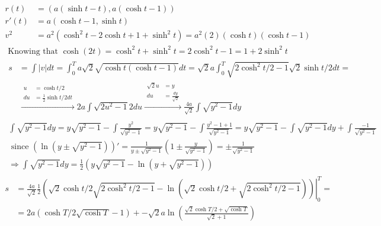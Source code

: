 \documentclass[twoside]{amsart}
\theoremstyle{plain}
\theoremstyle{definition}
\newcommand{\exercisehead}[1]
  {\smallskip
   \noindent{\small\bf Exercise #1.}}
\begin{document}
\exercisehead{5} 
\[
\begin{aligned}
  r(t) & = (a(\sinh{t}-t), a(\cosh{t} -1) ) \\
  r'(t) & = a(\cosh{t} - 1,\sinh{t}) \\
  v^2 & = a^2 (\cosh^2{t} - 2\cosh{t} + 1 + \sinh^2{t} ) = a^2 (2) (\cosh{t})(\cosh{t}-1)
\end{aligned}
\]
\[
\begin{gathered}
\text{ Knowing that } \cosh{(2t)} = \cosh^2{t} + \sinh^2{t} = 2 \cosh^2{t} - 1 = 1 +2 \sinh^2{t} \\
  \begin{aligned}
    s & = \int |v| dt = \int_0^T a\sqrt{2} \sqrt{ \cosh{t}(\cosh{t} -1) } dt = \sqrt{2} a \int_0^T \sqrt{ 2 \cosh^2{t/2}-1} \sqrt{2} \sinh{t/2} dt = \\
    & \xrightarrow{ \begin{aligned}
	u & = \cosh{t/2} \\
	du & = \frac{1}{2} \sinh{t/2} dt 
\end{aligned} } 2a \int \sqrt{ 2u^2 - 1} 2 du \xrightarrow{ \begin{aligned} \sqrt{2} u & = y \\
	du & = \frac{dy}{\sqrt{2}} \end{aligned} } \frac{4 a}{\sqrt{2}} \int \sqrt{ y^2 - 1 } dy 
  \end{aligned} \\
\begin{gathered}
  \int \sqrt{ y^2 - 1 } dy = y \sqrt{ y^2 - 1 } - \int \frac{y^2}{ \sqrt{y^2 -1 } } = y \sqrt{ y^2 -1} -\int \frac{ y^2 - 1 + 1 }{ \sqrt{ y^2 - 1 }} = y \sqrt{ y^2 - 1 } - \int \sqrt{ y^2 - 1 } dy + \int \frac{-1}{ \sqrt{ y^2 -1 } } \\
  \text{ since } ( \ln{ (y \pm \sqrt{ y^2 - 1 } ) } )' = \frac{ 1}{ y \pm \sqrt{ y^2 - 1 } } \left( 1 \pm \frac{y}{\sqrt{ y^2 - 1 } } \right) = \pm \frac{1}{ \sqrt{ y^2 - 1 }} \\
  \Longrightarrow \int \sqrt{ y^2 - 1 } dy = \frac{1}{2} (y \sqrt{ y^2 - 1 } - \ln{ (y + \sqrt{ y^2 - 1 } ) } ) 
\end{gathered}
\end{gathered}
\]
\[
\begin{aligned}
  s & = \frac{4a}{\sqrt{2}} \frac{1}{2} \left. \left( \sqrt{2} \cosh{t/2} \sqrt{ 2\cosh^2{t/2} - 1 } - \ln{ (\sqrt{2} \cosh{t/2} + \sqrt{ 2 \cosh^2{t/2} - 1 } ) } \right) \right|_0^T = \\
  & = \boxed{ 2a (\cosh{T/2} \sqrt{ \cosh{T}} - 1 ) + -\sqrt{2} a \ln{ \left( \frac{ \sqrt{2} \cosh{T/2} + \sqrt{\cosh{T}} }{ \sqrt{2} + 1 } \right) } }
\end{aligned}
\]
\end{document}
